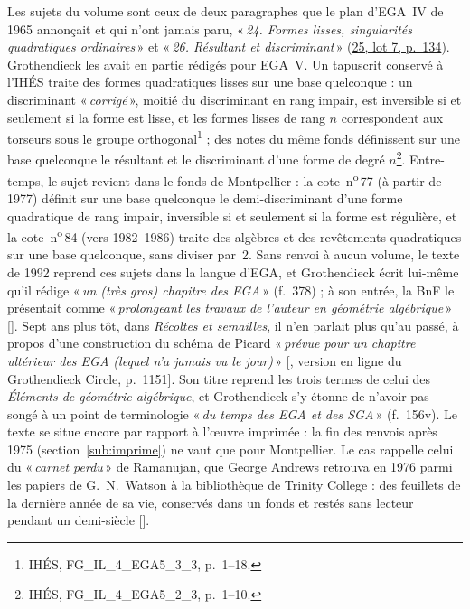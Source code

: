 \documentclass[11pt]{amsart}
\makeatletter
\newcommand{\q}[1]{«\,\textit{#1}\,»}
\newcommand{\cote}[1]{\mbox{n\textsuperscript{o}\,#1}}
\def\RHM@first#1--#2\@nil{#1}
\DeclareRobustCommand{\lot}[3]{\begingroup\edef\RHM@pdfpage{\the\numexpr\RHM@first#3--\@nil+1\relax}\href{https://grothendieck.umontpellier.fr/#1.pdf\#page=\RHM@pdfpage}{#1, lot #2, p.~#3}\endgroup}
\newcommand{\lot}[3]{\href{https://grothendieck.commutator.io/\##1/#2/p#3}{#1, lot #2, p.~#3}}
\makeatother
\begin{document}
Les sujets du volume sont ceux de deux paragraphes que le plan d'EGA~IV de 1965 annonçait et qui n'ont jamais paru, \q{24. Formes lisses, singularités quadratiques ordinaires} et \q{26. Résultant et discriminant} (\lot{25}{7}{134}). Grothendieck les avait en partie rédigés pour EGA~V. Un tapuscrit conservé à l'IHÉS traite des formes quadratiques lisses sur une base quelconque : un discriminant \q{corrigé}, moitié du discriminant en rang impair, est inversible si et seulement si la forme est lisse, et les formes lisses de rang $n$ correspondent aux torseurs sous le groupe orthogonal\footnote{IHÉS, FG\_IL\_4\_EGA5\_3\_3, p.~1--18.} ; des notes du même fonds définissent sur une base quelconque le résultant et le discriminant d'une forme de degré $n$\footnote{IHÉS, FG\_IL\_4\_EGA5\_2\_3, p.~1--10.}. Entre-temps, le sujet revient dans le fonds de Montpellier : la cote~\cote{77} (à partir de 1977) définit sur une base quelconque le demi-discriminant d'une forme quadratique de rang impair, inversible si et seulement si la forme est régulière, et la cote~\cote{84} (vers 1982--1986) traite des algèbres et des revêtements quadratiques sur une base quelconque, sans diviser par~2. Sans renvoi à aucun volume, le texte de 1992 reprend ces sujets dans la langue d'EGA, et Grothendieck écrit lui-même qu'il rédige \q{un (très gros) chapitre des EGA} (f.~378) ; à son entrée, la BnF le présentait comme \q{prolongeant les travaux de l'auteur en géométrie algébrique} [\citealp{bnf2023cp}]. Sept ans plus tôt, dans \emph{Récoltes et semailles}, il n'en parlait plus qu'au passé, à propos d'une construction du schéma de Picard \q{prévue pour un chapitre ultérieur des EGA (lequel n'a jamais vu le jour)} [\citealp{grothendieck2022}, version en ligne du Grothendieck Circle, p.~1151]. Son titre reprend les trois termes de celui des \emph{Éléments de géométrie algébrique}, et Grothendieck s'y étonne de n'avoir pas songé à un point de terminologie \q{du temps des EGA et des SGA} (f.~156v). Le texte se situe encore par rapport à l'œuvre imprimée : la fin des renvois après 1975 (section~\ref{sub:imprime}) ne vaut que pour Montpellier. Le cas rappelle celui du \q{carnet perdu} de Ramanujan, que George Andrews retrouva en 1976 parmi les papiers de G.~N.~Watson à la bibliothèque de Trinity College : des feuillets de la dernière année de sa vie, conservés dans un fonds et restés sans lecteur pendant un demi-siècle [\citealp{andrews1979}].
\end{document}
